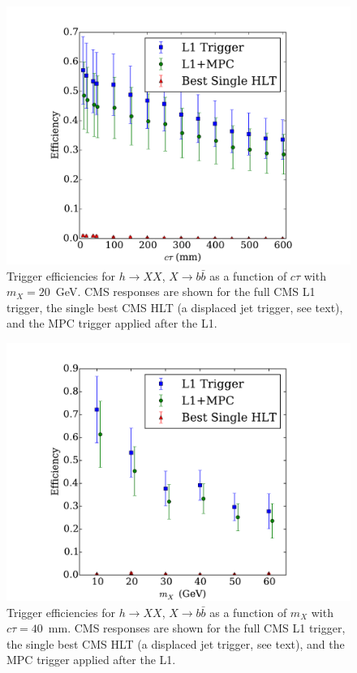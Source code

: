 \documentclass[aps,prl,twocolumn,preprintnumbers,groupedaddress,nofootinbib]{revtex4}
\begin{document}
\begin{figure}[t]

\includegraphics[width=0.9\columnwidth]{./EffVsCtau.pdf}

\caption{Trigger efficiencies for $h\to XX$, $X\to b\bar{b}$ as a function of $c\tau$ with $m_X = 20$~GeV. CMS responses are shown for the full CMS L1 trigger, the single best CMS HLT (a displaced jet trigger, see text), and the MPC trigger applied after the L1. \label{fig:125higgsctautrigger}}
\end{figure} 

\begin{figure}[t]

\includegraphics[width=0.9\columnwidth]{./EffVsMX.pdf}

\caption{Trigger efficiencies for $h\to XX$, $X\to b\bar{b}$ as a function of $m_X$ with $c\tau = 40$~mm. CMS responses are shown for the full CMS L1 trigger, the single best CMS HLT (a displaced jet trigger, see text), and the MPC trigger applied after the L1. \label{fig:125higgsmxtrigger}}
\end{figure} 
\end{document}
